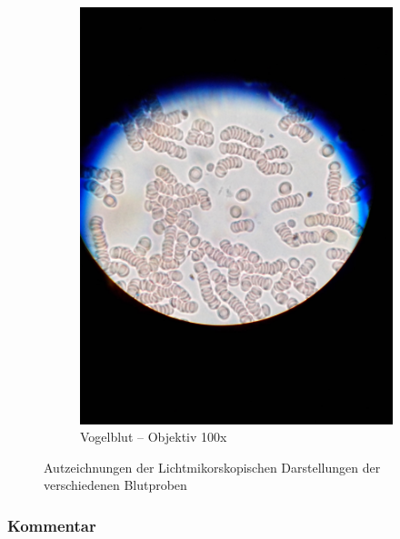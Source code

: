 \begin{figure}[h!]
\begin{subfigure}[b]{0.3\textwidth}
		\includegraphics[width=1\textwidth]{../images/02_own_blood.jpg}
		\caption{Vogelblut -- Objektiv 100x}
	\end{subfigure}
	\caption{Autzeichnungen der Lichtmikorskopischen Darstellungen der
		verschiedenen Blutproben}
\end{figure}

\subsubsection{Kommentar}
